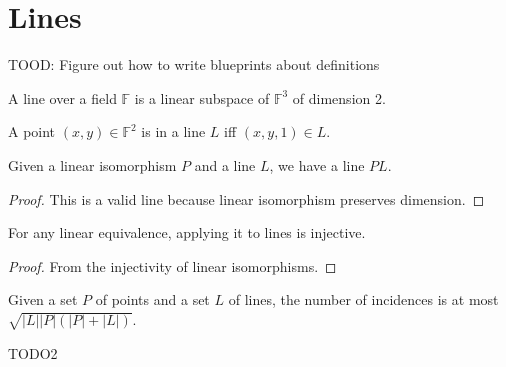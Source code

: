 \chapter{Lines}
\label{chap:line}

TOOD: Figure out how to write blueprints about definitions

\begin{definition}
    \label{Line}
    \leanok
    A line over a field $\mathbb{F}$ is a linear subspace of $\mathbb{F}^3$ of dimension 2.
\end{definition}

\begin{definition}
    \label{Line_mem}
    \leanok
    A point $(x, y) \in \mathbb{F}^2$ is in a line $L$ iff $(x, y, 1) \in L$.
\end{definition}

\begin{definition}
    \label{line_apply}
    \leanok
    Given a linear isomorphism $P$ and a line $L$, we have a line $PL$.
\end{definition}

\begin{proof}
    \leanok
    This is a valid line because linear isomorphism preserves dimension.
\end{proof}

\begin{lemma}
    \label{apply_injective}
    \leanok
    For any linear equivalence, applying it to lines is injective.
\end{lemma}

\begin{proof}
    \leanok
    From the injectivity of linear isomorphisms.
\end{proof}

\begin{theorem}
    \label{CS_UB}
    \leanok
    Given a set $P$ of points and a set $L$ of lines, the number of incidences is at most
    $\sqrt{|L| |P| (|P| + |L|)}$.
\end{theorem}

TODO2